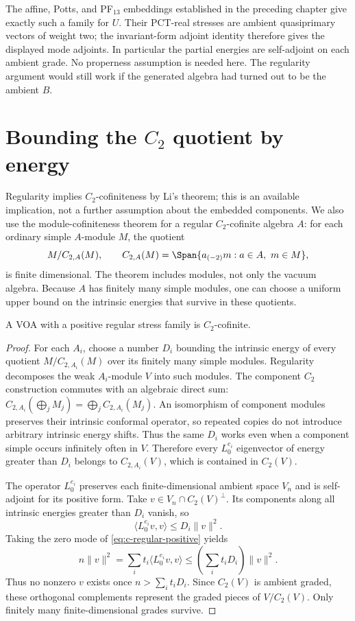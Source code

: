 The affine, Potts, and PF$_{13}$ embeddings established in the preceding
chapter give exactly such a family for $U$. Their PCT-real stresses
are ambient quasiprimary vectors of weight two; the invariant-form
adjoint identity therefore gives the displayed mode adjoints.
In particular the partial energies are self-adjoint on each ambient
grade. No properness assumption
is needed here. The regularity argument would still work if the
generated algebra had turned out to be the ambient $B$.

\section{\texorpdfstring{Bounding the $C_2$ quotient by energy}{Bounding the C2 quotient by energy}}

Regularity implies $C_2$-cofiniteness by Li's theorem; this is an
available implication, not a further assumption about the embedded
components. We also use the module-cofiniteness theorem for a regular
$C_2$-cofinite algebra $A$: for each ordinary simple $A$-module $M$,
the quotient
\[
 M/C_{2,A}(M),\qquad
 C_{2,A}(M)=\Span\{a_{(-2)}m:a\in A,\ m\in M\},
\]
is finite dimensional. The theorem includes modules, not only the
vacuum algebra. Because $A$ has finitely many simple modules, one can
choose a uniform upper bound on the intrinsic energies that survive
in these quotients.

\begin{proposition}
\label{prop:c-c2}
A VOA with a positive regular stress family is $C_2$-cofinite.
\end{proposition}
\begin{proof}
For each $A_i$, choose a number $D_i$ bounding the intrinsic energy
of every quotient $M/C_{2,A_i}(M)$ over its finitely many simple
modules. Regularity decomposes the weak $A_i$-module $V$ into such
modules. The component $C_2$ construction commutes with an algebraic
direct sum:
$C_{2,A_i}(\bigoplus_jM_j)=\bigoplus_jC_{2,A_i}(M_j)$.
An isomorphism of component modules preserves their intrinsic
conformal operator, so repeated copies do not introduce arbitrary
intrinsic energy shifts. Thus the same $D_i$ works even when a
component simple occurs infinitely often in $V$.
Therefore every $L^{e_i}_0$ eigenvector of energy greater
than $D_i$ belongs to $C_{2,A_i}(V)$, which is contained in $C_2(V)$.

The operator $L^{e_i}_0$ preserves each finite-dimensional ambient
space $V_n$ and is self-adjoint for its positive form. Take
$v\in V_n\cap C_2(V)^\perp$. Its components along all intrinsic
energies greater than $D_i$ vanish, so
\[
 \langle L^{e_i}_0v,v\rangle\leq D_i\|v\|^2.
\]
Taking the zero mode of \eqref{eq:c-regular-positive} yields
\[
 n\|v\|^2=\sum_i t_i\langle L^{e_i}_0v,v\rangle
                 \leq\left(\sum_i t_iD_i\right)\|v\|^2.
\]
Thus no nonzero $v$ exists once $n>\sum_i t_iD_i$. Since $C_2(V)$
is ambient graded, these orthogonal complements represent the graded
pieces of $V/C_2(V)$. Only finitely many finite-dimensional grades
survive.
\end{proof}

